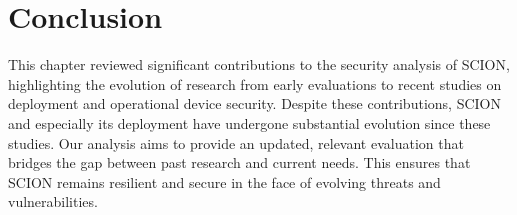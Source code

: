 \section{Conclusion}
This chapter reviewed significant contributions to the security analysis of SCION, highlighting the evolution of research from early evaluations to recent studies on deployment and operational device security.
Despite these contributions, SCION and especially its deployment have undergone substantial evolution since these studies.
Our analysis aims to provide an updated, relevant evaluation that bridges the gap between past research and current needs.
This ensures that SCION remains resilient and secure in the face of evolving threats and vulnerabilities.
